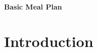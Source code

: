 \documentclass[11pt, a4paper]{article}
\begin{document}
\begin{center}
\huge{\textbf{Basic Meal Plan}}
\end{center}











\vspace{0.917 pc} %

\section*{Introduction}
\end{document}
